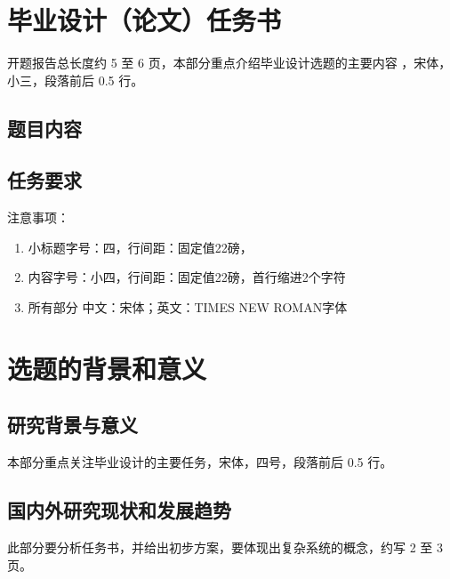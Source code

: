 \documentclass[UTF8,AutoFakeBold,AutoFakeSlant,zihao=-4]{ctexart}
\begin{document}




\pagestyle{fancy}
\setcounter{page}{1}
\fancyhf{}

\fancyfoot[C]{\fontsize{9pt}{9pt}\selectfont{\thepage}}
\renewcommand{\headrulewidth}{0pt}
\renewcommand{\footrulewidth}{0pt}

\setlength{\parskip}{0em}
\renewcommand{\baselinestretch}{1.53}
\setlength{\parindent}{1.02cm}

\section{毕业设计（论文）任务书}
开题报告总长度约 5 至 6 页，本部分重点介绍毕业设计选题的主要内容 \cite{LeCun2010}，宋体，小三，段落前后 0.5 行。

\subsection{题目内容}
\subsection{任务要求}
\noindent 注意事项：
\begin{enumerate}
	\item 小标题字号：四，行间距：固定值22磅，
	\item 内容字号：小四，行间距：固定值22磅，首行缩进2个字符  
	\item 所有部分  中文：宋体；英文：TIMES NEW ROMAN字体
\end{enumerate}

\section{选题的背景和意义}
\subsection{研究背景与意义}
本部分重点关注毕业设计的主要任务，宋体，四号，段落前后 0.5 行。

\subsection{国内外研究现状和发展趋势}
此部分要分析任务书，并给出初步方案，要体现出复杂系统的概念，约写 2 至 3 页。
\end{document}
